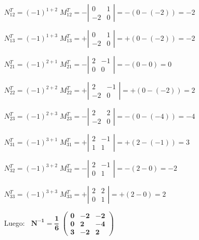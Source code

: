 \begin{proofw}
\noindent $N^T_{12}=(-1)^{1+2}\; M^T_{12}=-\left| \begin{matrix} 0&1\\-2&0 \end{matrix}\right| = - (0-(-2))=-2 $

\noindent $N^T_{13}=(-1)^{1+3}\; M^T_{13}=+\left| \begin{matrix} 0&1\\-2&0 \end{matrix}\right| = + (0-(-2))=-2 $

\noindent $N^T_{21}=(-1)^{2+1}\; M^T_{21}=-\left| \begin{matrix} 2&-1\\0&0 \end{matrix}\right| = - (0-0)=0 $

\noindent $N^T_{22}=(-1)^{2+2}\; M^T_{22}=+\left| \begin{matrix} 2&-1\\-2&0 \end{matrix}\right| = + (0-(-2))=2 $

\noindent $N^T_{23}=(-1)^{2+3}\; M^T_{23}=-\left| \begin{matrix} 2&2\\-2&0 \end{matrix}\right| = - (0-(-4))=-4 $

\noindent $N^T_{31}=(-1)^{3+1}\; M^T_{31}=+\left| \begin{matrix} 2&-1\\1&1 \end{matrix}\right| = + (2-(-1))=3 $

\noindent $N^T_{32}=(-1)^{3+2}\; M^T_{32}=-\left| \begin{matrix} 2&-1\\0&1 \end{matrix}\right| = - (2-0)=-2 $

\noindent $N^T_{33}=(-1)^{3+3}\; M^T_{33}=+\left| \begin{matrix} 2&2\\0&1 \end{matrix}\right| = + (2-0)=2 $

\noindent Luego: $\; \boldsymbol{ \; N^{-1}= \dfrac 1 6 \; \left( \begin{matrix}
 0&-2&-2\\0&2&-4\\3&-2&2	
 \end{matrix} \right)\; }$
\end{proofw}


